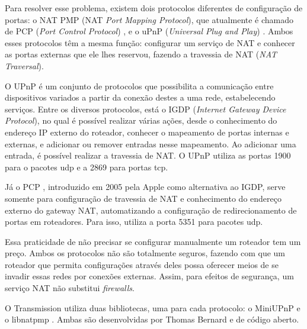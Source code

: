 Para resolver esse problema, existem dois protocolos diferentes de configuração de
portas: o NAT PMP (NAT \emph{Port Mapping Protocol}), que atualmente é chamado de PCP
(\emph{Port Control Protocol}) \cite{site:rfcpcp}, e o uPnP
(\emph{Universal Plug and Play}) \cite{site:rfcupnp}. Ambos esses protocolos têm a mesma
função: configurar um serviço de NAT e conhecer as portas externas que ele lhes
reservou, fazendo a travessia de NAT (\emph{NAT Traversal}).

O UPnP \cite{wiki:upnp} é um conjunto de protocolos que possibilita a comunicação entre
dispositivos variados a partir da conexão destes a uma rede, estabelecendo serviços.
Entre os diversos protocolos, está o IGDP (\emph{Internet Gateway Device Protocol}), no
qual é possível realizar várias ações, desde o conhecimento do endereço IP externo do
roteador, conhecer o mapeamento de portas internas e externas, e adicionar ou remover
entradas nesse mapeamento. Ao adicionar uma entrada, é possível realizar a travessia de
NAT. O UPnP utiliza as portas 1900 para o pacotes \gls*{udp} e a 2869 para portas
\gls*{tcp}.

Já o PCP \cite{wiki:pcp}, introduzido em 2005 pela Apple como alternativa ao IGDP,
serve somente para configuração de travessia de NAT e conhecimento do endereço externo
do gateway NAT, automatizando a configuração de redirecionamento de portas em
roteadores. Para isso, utiliza a porta 5351 para pacotes \gls*{udp}.

Essa praticidade de não precisar se configurar manualmente um roteador tem um preço.
Ambos os protocolos não são totalmente seguros, fazendo com que um roteador que permita
configurações através deles possa oferecer meios de se invadir essas redes por conexões
externas. Assim, para efeitos de segurança, um serviço NAT não substitui
\emph{firewalls}.

O Transmission utiliza duas bibliotecas, uma para cada protocolo: o MiniUPnP
\cite{site:miniupnp} e o libnatpmp \cite{site:libnatpmp}. Ambas são desenvolvidas por
Thomas Bernard e de código aberto.
